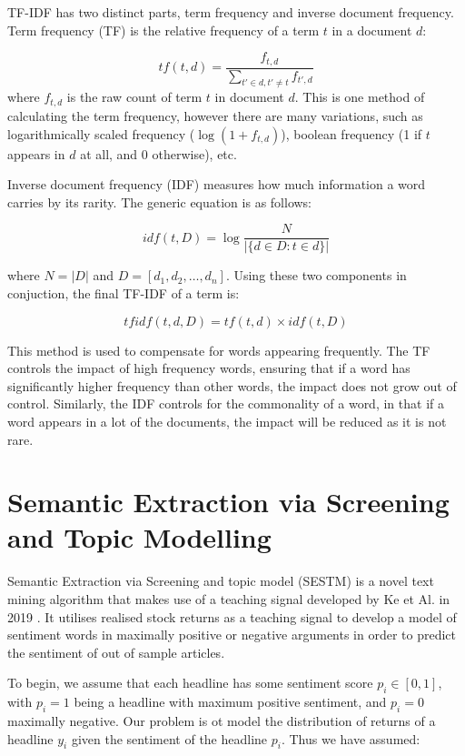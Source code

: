 TF-IDF has two distinct parts, term frequency and inverse document frequency. Term frequency (TF) is the relative frequency of a term $t$ in a document $d$:

\begin{equation}
tf(t,d) =  \frac{f_{t,d}}{\sum_{t'\in d, t' \neq t} f_{t',d}}
\end{equation}
where $f_{t,d}$ is the raw count of term $t$ in document $d$. This is one method of calculating the term frequency, however there are many variations, such as logarithmically scaled frequency ($\log(1 + f_{t,d})$), boolean frequency (1 if $t$ appears in $d$ at all, and 0 otherwise), etc.

Inverse document frequency (IDF) measures how much information a word carries by its rarity. The generic equation is as follows:

\begin{equation}
idf(t,D) = \log \frac{N}{|\{d \in D: t \in d\}|}
\end{equation}

\noindent
where $N = |D|$ and $D = [d_1, d_2, \dots, d_n]$. Using these two components in conjuction, the final TF-IDF of a term is:

\begin{equation}
tfidf(t,d,D) = tf(t,d) \times idf(t,D)
\end{equation}

\noindent
This method is used to compensate for words appearing frequently. The TF controls the impact of high frequency words, ensuring that if a word has significantly higher frequency than other words, the impact does not grow out of control. Similarly, the IDF controls for the commonality of a word, in that if a word appears in a lot of the documents, the impact will be reduced as it is not rare.

\section{Semantic Extraction via Screening and Topic Modelling}
Semantic Extraction via Screening and topic model (SESTM) is a novel text mining algorithm that makes use of a teaching signal developed by Ke et Al. in 2019 \cite{sestm}. It utilises realised stock returns as a teaching signal to develop a model of sentiment words in maximally positive or negative arguments in order to predict the sentiment of out of sample articles.

To begin, we assume that each headline has some sentiment score $p_i \in [0,1]$, with $p_i = 1$ being a headline with maximum positive sentiment, and $p_i = 0$ maximally negative. Our problem is ot model the distribution of returns of a headline $y_i$ given the sentiment of the headline $p_i$. Thus we have assumed:

